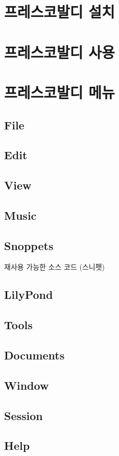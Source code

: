 \documentclass[12pt, a4paper, oneside]{book}
\let\stdsection\section
\renewcommand\section{\newpage\stdsection}
\begin{document}
	\section{프레스코발디 설치}


	\section{프레스코발디 사용}


	\section{프레스코발디 메뉴}

	\subsection{File}
	\subsection{Edit}
	\subsection{View}
	\subsection{Music}
	\subsection{Snoppets}
		재사용 가능한 소스 코드 (스니펫)

	\subsection{LilyPond}
	\subsection{Tools}
	\subsection{Documents}
	\subsection{Window}
	\subsection{Session}
	\subsection{Help}
\end{document}
